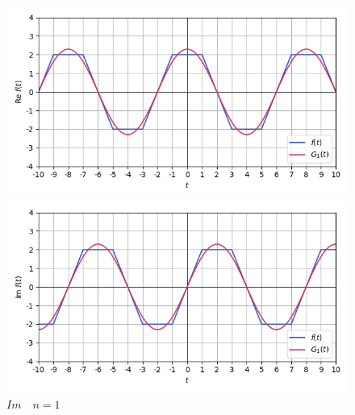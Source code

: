 \documentclass[a4paper]{article}
\begin{document}
\begin{figure}[H]
    \begin{minipage}{0.5\textwidth}
        \centering \includegraphics[width=\textwidth]{parametric_func/Re1.png}
        \caption{$Re\quad n = 1$}
    \end{minipage}\hfill
    \begin{minipage}{0.5\textwidth}
        \centering \includegraphics[width=\textwidth]{parametric_func/Im1.png}
        \caption{$Im\quad n = 1$}
    \end{minipage}
\end{figure}
\end{document}
